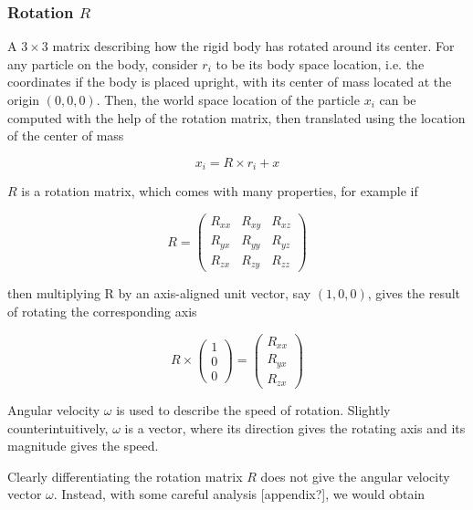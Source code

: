 \documentclass[runningheads]{llncs}
\begin{document}
\subsubsection{Rotation $R$} 

A $3\times 3$ matrix describing how the rigid body has rotated around its center. For any particle on the body, consider $r_i$ to be its body space location, i.e. the coordinates if the body is placed upright, with its center of mass located at the origin $(0, 0, 0)$. Then, the world space location of the particle $x_i$ can be computed with the help of the rotation matrix, then translated using the location of the center of mass

\begin{equation}
x_i = R\times r_i + x
\end{equation}

$R$ is a rotation matrix, which comes with many properties, for example if

\begin{equation}
    R = \begin{pmatrix}
        R_{xx} & R_{xy} & R_{xz} \\
        R_{yx} & R_{yy} & R_{yz} \\
        R_{zx} & R_{zy} & R_{zz}
    \end{pmatrix}
\end{equation}

then multiplying R by an axis-aligned unit vector, say $(1, 0, 0)$, gives the result of rotating the corresponding axis

\begin{equation}
R \times\begin{pmatrix}
    1 \\
    0 \\
    0
    \end{pmatrix}
    =
    \begin{pmatrix}
    R_{xx} \\
    R_{yx} \\
    R_{zx}
    \end{pmatrix}
\end{equation}

Angular velocity $\omega$ is used to describe the speed of rotation. Slightly counterintuitively, $\omega$ is a vector, where its direction gives the rotating axis and its magnitude gives the speed.

Clearly differentiating the rotation matrix $R$ does not give the angular velocity vector $\omega$. Instead, with some careful analysis [appendix?], we would obtain
\end{document}
